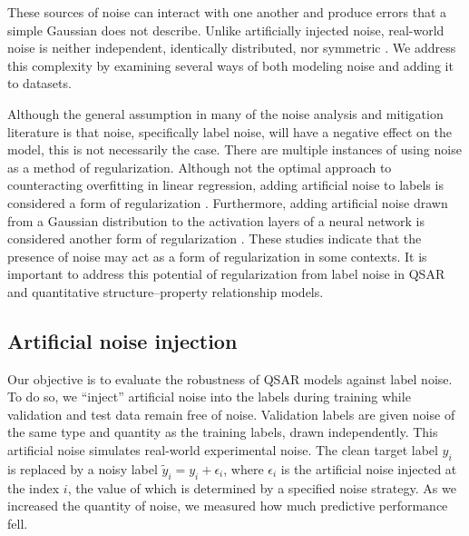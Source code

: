 These sources of noise can interact with one another and produce errors that a simple Gaussian does not describe. Unlike artificially injected noise, real-world noise is neither independent, identically distributed, nor symmetric \citep{Heid2023}. We address this complexity by examining several ways of both modeling noise and adding it to datasets.

Although the general assumption in many of the noise analysis and mitigation literature is that noise, specifically label noise, will have a negative effect on the model, this is not necessarily the case. There are multiple instances of using noise as a method of regularization. Although not the optimal approach to counteracting overfitting in linear regression, adding artificial noise to labels is considered a form of regularization \citep{Ullah2024}. Furthermore, adding artificial noise drawn from a Gaussian distribution to the activation layers of a neural network is considered another form of regularization \citep{Camuto2021}. These studies indicate that the presence of noise may act as a form of regularization in some contexts. It is important to address this potential of regularization from label noise in QSAR and quantitative structure--property relationship models.

\subsection{Artificial noise injection}\label{sec:noise_injection}

Our objective is to evaluate the robustness of QSAR models against label noise. To do so, we ``inject'' artificial noise into the labels during training while validation and test data remain free of noise. Validation labels are given noise of the same type and quantity as the training labels, drawn independently. This artificial noise simulates real-world experimental noise. The clean target label $y_i$ is replaced by a noisy label $\tilde{y}_i = y_i + \epsilon_i$, where $\epsilon_i$ is the artificial noise injected at the index $i$, the value of which is determined by a specified noise strategy. As we increased the quantity of noise, we measured how much predictive performance fell. 

